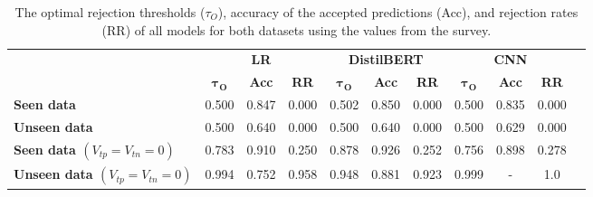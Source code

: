 \begin{table}
    \scriptsize
    \centering
    \begin{tabular}{lcccccccccc}
        \toprule
                                                 & \multicolumn{3}{c}{\textbf{LR}} & \multicolumn{3}{c}{\textbf{DistilBERT}} & \multicolumn{3}{c}{\textbf{CNN}}                                                                                                           \\
        \cmidrule(l){2-4} \cmidrule(l){5-7} \cmidrule(l){8-10}
                                                 & $\boldsymbol{\tau_O}$           & \textbf{Acc}                            & \textbf{RR}                      & $\boldsymbol{\tau_O}$ & \textbf{Acc} & \textbf{RR} & $\boldsymbol{\tau_O}$ & \textbf{Acc} & \textbf{RR} \\
        \midrule
        \textbf{Seen data}                       & 0.500                           & 0.847                                   & 0.000                            & 0.502                 & 0.850        & 0.000       & 0.500                 & 0.835        & 0.000       \\
        \textbf{Unseen data}                     & 0.500                           & 0.640                                   & 0.000                            & 0.500                 & 0.640        & 0.000       & 0.500                 & 0.629        & 0.000       \\
        \midrule
        \textbf{Seen data $(V_{tp}=V_{tn}=0)$}   & 0.783                           & 0.910                                   & 0.250                            & 0.878                 & 0.926        & 0.252       & 0.756                 & 0.898        & 0.278       \\
        \textbf{Unseen data $(V_{tp}=V_{tn}=0)$} & 0.994                           & 0.752                                   & 0.958                            & 0.948                 & 0.881        & 0.923       & 0.999                 & -            & 1.0         \\
        \bottomrule
    \end{tabular}
    \caption{The optimal rejection thresholds ($\tau_O$), accuracy of the accepted predictions (Acc), and rejection rates (RR) of all models for both datasets using the values from the survey.}
    \label{tab:metric}
\end{table}

